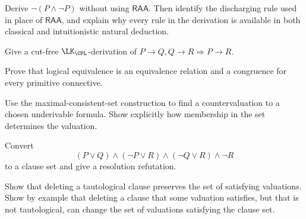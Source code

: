 \begin{exercise}
\label{ex:prop-metatheory-07}
Derive \(\neg(P\land\neg P)\) without using \(\mathsf{RAA}\).  Then
identify the discharging rule used in place of \(\mathsf{RAA}\), and explain
why every rule in the derivation is available in both classical and
intuitionistic natural deduction.
\end{exercise}

\begin{exercise}
\label{ex:prop-metatheory-08}
Give a cut-free \(\LK_{\CPL}\)-derivation of
\(P\to Q, Q\to R\Rightarrow P\to R\).
\end{exercise}

\begin{exercise}
\label{ex:prop-metatheory-09}
Prove that logical equivalence is an equivalence relation and a congruence for
every primitive connective.
\end{exercise}

\begin{exercise}
\label{ex:prop-metatheory-10}
Use the maximal-consistent-set construction to find a countervaluation to a
chosen underivable formula.  Show explicitly how membership in the
set determines the valuation.
\end{exercise}

\begin{exercise}
\label{ex:prop-metatheory-11}
Convert
\[
 (P\lor Q)\land(\neg P\lor R)\land(\neg Q\lor R)\land\neg R
\]
to a clause set and give a resolution refutation.
\end{exercise}

\begin{exercise}
\label{ex:prop-metatheory-12}
Show that deleting a tautological clause preserves the set of satisfying
valuations.  Show by example that deleting a clause that some valuation
satisfies, but that is not tautological, can change the set of valuations
satisfying the clause set.
\end{exercise}

